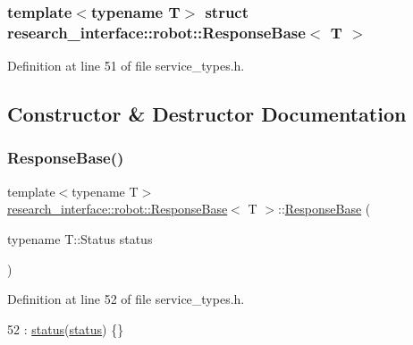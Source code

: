 \subsubsection*{template$<$typename T$>$\newline
struct research\+\_\+interface\+::robot\+::\+Response\+Base$<$ T $>$}



Definition at line 51 of file service\+\_\+types.\+h.



\subsection{Constructor \& Destructor Documentation}
\mbox{\label{structresearch__interface_1_1robot_1_1ResponseBase_a10b3259c2dfd5ed4c4297e5993245fff}} 
\subsubsection{\texorpdfstring{Response\+Base()}{ResponseBase()}}
{\footnotesize\ttfamily template$<$typename T$>$ \\
\hyperlink{structresearch__interface_1_1robot_1_1ResponseBase}{research\+\_\+interface\+::robot\+::\+Response\+Base}$<$ T $>$\+::\hyperlink{structresearch__interface_1_1robot_1_1ResponseBase}{Response\+Base} (\begin{DoxyParamCaption}\item[{typename T\+::\+Status}]{status }\end{DoxyParamCaption})\hspace{0.3cm}{\ttfamily [inline]}}



Definition at line 52 of file service\+\_\+types.\+h.


\begin{DoxyCode}
52 : \hyperlink{structresearch__interface_1_1robot_1_1ResponseBase_a99bb821172a0ac77338cd8e0acbe8a96}{status}(\hyperlink{structresearch__interface_1_1robot_1_1ResponseBase_a99bb821172a0ac77338cd8e0acbe8a96}{status}) \{\}
\end{DoxyCode}


